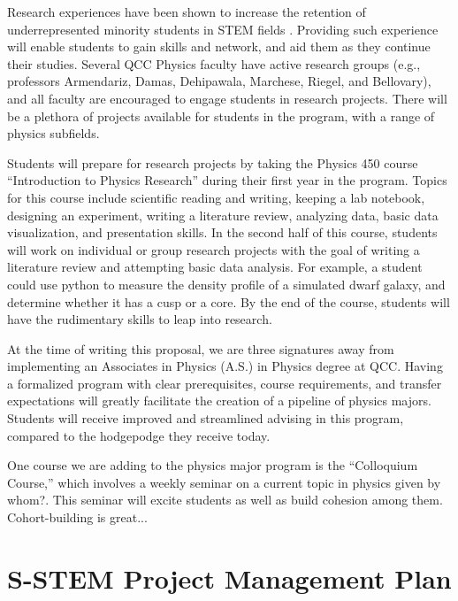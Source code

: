 \documentclass[12pt]{article}
\newcommand\new[1]{{\color{blue}#1}}
\begin{document}
Research experiences have been shown to increase the retention of underrepresented minority students in STEM fields \citep{Graham,Russell}.  Providing such experience will enable students to gain skills and network, and aid them as they continue their studies.  Several QCC Physics faculty have active research groups (e.g., professors Armendariz, Damas, Dehipawala, Marchese, Riegel, and Bellovary), and all faculty are encouraged to engage students in research projects.  There will be a plethora of projects available for students in the program, with a range of physics subfields.  %

Students will prepare for research projects by taking the Physics 450 course ``Introduction to Physics Research'' during their first year in the program.   Topics for this course include scientific reading and writing, keeping a lab notebook, designing an experiment, writing a literature review, analyzing data, basic data visualization, and presentation skills.  In the second half of this course, students will work on individual or group research projects with the goal of writing a literature review and attempting basic data analysis.  For example, a student could use python to measure the density profile of a simulated dwarf galaxy, and determine whether it has a cusp or a core.  By the end of the course, students will have the rudimentary skills to leap into research.

At the time of writing this proposal, we are \new{three signatures away} from implementing an Associates in Physics (A.S.) in Physics degree at QCC.  Having a formalized program with clear prerequisites, course requirements, and transfer expectations will greatly facilitate the creation of a pipeline of physics majors.  Students will receive improved and streamlined advising in this program, compared to the hodgepodge they receive today.  

One course we are adding to the physics major program is the ``Colloquium Course,'' which involves a weekly seminar on a current topic in physics \new{given by whom?}.  This seminar will excite students as well as build cohesion among them.  \new{Cohort-building is great...}

\section{S-STEM Project Management Plan}
\end{document}
